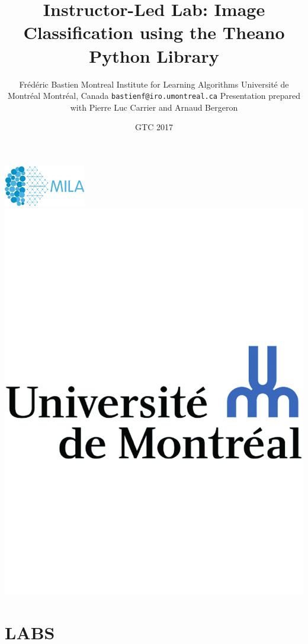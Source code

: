 \documentclass[utf8x,xcolor=pdftex,dvipsnames,table]{beamer}
\title{Instructor-Led Lab: Image Classification using the Theano Python Library}
\author{%
\footnotesize
Frédéric Bastien \newline
\newline
\newline
Montreal Institute for Learning Algorithms \newline
Université de Montréal \newline
Montréal, Canada \newline
\texttt{bastienf@iro.umontreal.ca} \newline \newline
Presentation prepared with Pierre Luc Carrier and Arnaud Bergeron
}
\date{GTC 2017}
\begin{document}
\begin{frame}[plain]
 \titlepage
 \vspace{-5em}
 \includegraphics[width=1.4in]{pics/MILA.png}
 \hfill
 \includegraphics[width=.8in]{pics/UdeM_NoirBleu_logo_Marie_crop}
\end{frame}

\section{LABS}
\end{document}
